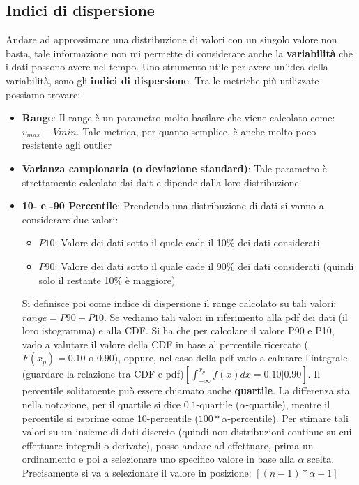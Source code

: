 \subsection{Indici di dispersione}
Andare ad approssimare una distribuzione di valori con un singolo valore non basta, tale informazione non mi permette di considerare anche la \textbf{variabilità} che i dati possono avere nel tempo.
Uno strumento utile per avere un'idea della variabilità, sono gli \textbf{indici di dispersione}. Tra le metriche più utilizzate possiamo trovare:
\begin{itemize}
\item \textbf{Range}: Il range è un parametro molto basilare che viene calcolato come: \(v_{max} - V{min}\). Tale metrica, per quanto semplice, è anche molto poco resistente agli outlier
\item \textbf{Varianza campionaria (o deviazione standard)}: Tale parametro è strettamente calcolato dai dait e dipende dalla loro distribuzione
\item \textbf{10- e -90 Percentile}: Prendendo una distribuzione di dati si vanno a considerare due valori:
\begin{itemize}
    \item \textbf{\(P10\)}: Valore dei dati sotto il quale cade il 10\% dei dati considerati
    \item \textbf{\(P90\)}: Valore dei dati sotto il quale cade il 90\% dei dati considerati (quindi solo il restante 10\% è maggiore)
\end{itemize}
Si definisce poi come indice di dispersione il range calcolato su tali valori: \(range = P90-P10\). Se vediamo tali valori in riferimento alla pdf dei dati (il loro istogramma) e alla CDF. Si ha che per calcolare il valore P90 e P10, vado a valutare il valore della CDF in base al percentile ricercato (\(F(x_p) = 0.10\) o \(0.90\)), oppure, nel caso della pdf vado a calutare l'integrale (guardare la relazione tra CDF e pdf)\(\left [\int_{-\infty}^{x_p}f(x)dx = 0.10 | 0.90\right ]\). Il percentile solitamente può essere chiamato anche \textbf{quartile}. La differenza sta nella notazione, per il quartile si dice \(0.1\)-quartile (\(\alpha\)-quartile), mentre il percentile si esprime come 10-percentile (\(100*\alpha\)-percentile). Per stimare tali valori su un insieme di dati discreto (quindi non distribuzioni continue su cui effettuare integrali o derivate), posso andare ad effettuare, prima un ordinamento e poi a selezionare uno specifico valore in base alla \(\alpha\) scelta. Precisamente si va a selezionare il valore in posizione: \([(n-1)*\alpha + 1]\)


\end{itemize}
